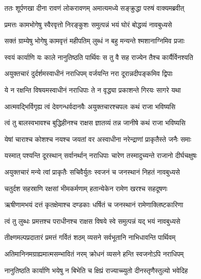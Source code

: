
\twolineshloka
{ततः शूर्पणखा दीना रावणं लोकरावणम्}
{अमात्यमध्ये सङ्क्रुद्धा परुषं वाक्यमब्रवीत्} %

\twolineshloka
{प्रमत्तः कामभोगेषु स्वैरवृत्तो निरङ्कुशः}
{समुत्पन्नं भयं घोरं बोद्धव्यं नावबुध्यसे} %

\twolineshloka
{सक्तं ग्राम्येषु भोगेषु कामवृत्तं महीपतिम्}
{लुब्धं न बहु मन्यन्ते श्मशानाग्निमिव प्रजाः} %

\twolineshloka
{स्वयं कार्याणि यः काले नानुतिष्ठति पार्थिवः}
{स तु वै सह राज्येन तैश्च कार्यैर्विनश्यति} %

\twolineshloka
{अयुक्तचारं दुर्दर्शमस्वाधीनं नराधिपम्}
{वर्जयन्ति नरा दूरान्नदीपङ्कमिव द्विपाः} %

\twolineshloka
{ये न रक्षन्ति विषयमस्वाधीनं नराधिपाः}
{ते न वृद्ध्या प्रकाशन्ते गिरयः सागरे यथा} %

\twolineshloka
{आत्मवद्भिर्विगृह्य त्वं देवगन्धर्वदानवैः}
{अयुक्तचारश्चपलः कथं राजा भविष्यसि} %

\twolineshloka
{त्वं तु बालस्वभावश्च बुद्धिहीनश्च राक्षस}
{ज्ञातव्यं तन्न जानीषे कथं राजा भविष्यसि} %

\twolineshloka
{येषां चाराश्च कोशश्च नयश्च जयतां वर}
{अस्वाधीना नरेन्द्राणां प्राकृतैस्ते जनैः समाः} %

\twolineshloka
{यस्मात् पश्यन्ति दूरस्थान् सर्वानर्थान् नराधिपाः}
{चारेण तस्मादुच्यन्ते राजानो दीर्घचक्षुषः} %

\twolineshloka
{अयुक्तचारं मन्ये त्वां प्राकृतैः सचिवैर्युतः}
{स्वजनं च जनस्थानं निहतं नावबुध्यसे} %

\twolineshloka
{चतुर्दश सहस्राणि रक्षसां भीमकर्मणाम्}
{हतान्येकेन रामेण खरश्च सहदूषणः} %

\twolineshloka
{ऋषीणामभयं दत्तं कृतक्षेमाश्च दण्डकाः}
{धर्षितं च जनस्थानं रामेणाक्लिष्टकारिणा} %

\twolineshloka
{त्वं तु लुब्धः प्रमत्तश्च पराधीनश्च राक्षस}
{विषये स्वे समुत्पन्नं यद् भयं नावबुध्यसे} %

\twolineshloka
{तीक्ष्णमल्पप्रदातारं प्रमत्तं गर्वितं शठम्}
{व्यसने सर्वभूतानि नाभिधावन्ति पार्थिवम्} %

\twolineshloka
{अतिमानिनमग्राह्यमात्मसम्भावितं नरम्}
{क्रोधनं व्यसने हन्ति स्वजनोऽपि नराधिपम्} %

\twolineshloka
{नानुतिष्ठति कार्याणि भयेषु न बिभेति च}
{क्षिप्रं राज्याच्च्युतो दीनस्तृणैस्तुल्यो भवेदिह} %


